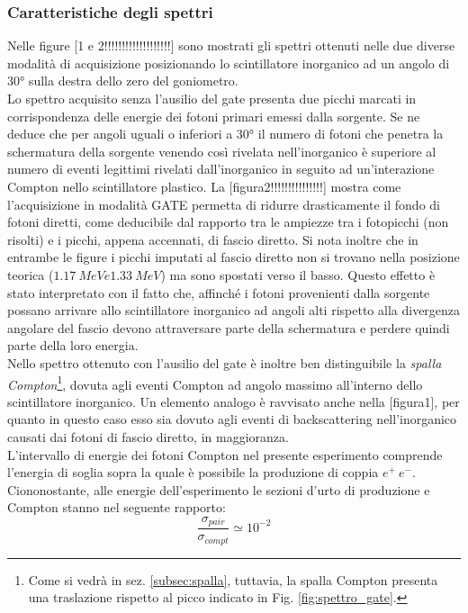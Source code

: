 \documentclass[5pt]{article}
\begin{document}
\subsubsection{Caratteristiche degli spettri}
Nelle figure [1 e 2!!!!!!!!!!!!!!!!!!!] sono mostrati gli spettri ottenuti nelle due diverse modalità di acquisizione posizionando lo scintillatore inorganico ad un angolo di 30° sulla destra dello zero del goniometro. \\
Lo spettro acquisito senza l'ausilio del gate presenta due picchi marcati in corrispondenza delle energie dei fotoni primari emessi dalla sorgente. Se ne deduce che per angoli uguali o inferiori a 30° il numero di fotoni che penetra la schermatura della sorgente venendo così rivelata nell'inorganico è superiore al numero di eventi legittimi rivelati dall'inorganico in seguito ad un'interazione Compton nello scintillatore plastico.
La [figura2!!!!!!!!!!!!!!!] mostra come l'acquisizione in modalità GATE permetta di ridurre drasticamente il fondo di fotoni diretti, come deducibile dal rapporto tra le ampiezze tra i fotopicchi (non risolti) e i picchi, appena accennati, di fascio diretto. Si nota inoltre che in entrambe le figure i picchi imputati al fascio diretto non si trovano nella posizione teorica ($1.17 \ MeV e 1.33 \ MeV$) ma sono spostati verso il basso. Questo effetto è stato interpretato con il fatto che, affinché i fotoni provenienti dalla sorgente possano arrivare allo scintillatore inorganico ad angoli alti rispetto alla divergenza angolare del fascio devono attraversare parte della schermatura e perdere quindi parte della loro energia. \\
Nello spettro ottenuto con l'ausilio del gate è inoltre ben distinguibile la \textit{spalla Compton}\footnote{Come si vedrà in sez. \ref{subsec:spalla}, tuttavia, la spalla Compton presenta una traslazione rispetto al picco indicato in Fig. \ref{fig:spettro_gate}.}, dovuta agli eventi Compton ad angolo massimo all'interno dello scintillatore inorganico. Un elemento analogo è ravvisato anche nella [figura1], per quanto in questo caso esso sia dovuto agli eventi di backscattering nell'inorganico causati dai fotoni di fascio diretto, in maggioranza.\\
L'intervallo di energie dei fotoni Compton nel presente esperimento comprende l'energia di soglia sopra la quale è possibile la produzione di coppia $e^+\ e^-$. Ciononostante, alle energie dell'esperimento le sezioni d'urto di produzione e Compton stanno nel seguente rapporto:
\begin{equation}
\frac{\sigma_{pair}}{\sigma_{compt}}\simeq 10^{-2}
\end{equation}
\end{document}
